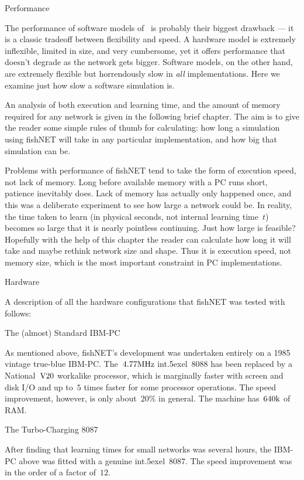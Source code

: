 \chap Performance

The performance of software models of \nns\ is probably their biggest
drawback ---
it is a classic tradeoff between flexibility and speed.
A hardware model is extremely inflexible, limited in size, and very 
cumbersome, yet it
offers performance that doesn't degrade as the network gets bigger.
Software models, on the other hand, are extremely flexible but
horrendously slow in {\sl all} implementations.
Here we examine just how slow a software simulation is.

An analysis of both execution and learning time, and the amount of
memory required for any network is given in the following brief
chapter.
The aim is to give the reader some simple rules of thumb for
calculating: how long a simulation using fishNET will take in any
particular implementation, and how big that simulation can be.

Problems with performance of fishNET tend to take the form of
execution speed, not lack of memory.
Long before available memory with a PC runs short, patience
inevitably does.
Lack of memory has actually only happened once, and this was a
deliberate experiment to see how large a network could be.
In reality, the time taken to learn (in physical seconds, not
internal learning time~$t$) becomes so large that it is nearly
pointless continuing.
Just how large is feasible?
Hopefully with the help of this chapter the reader can calculate how
long it will take and maybe rethink network size and shape.
Thus it is execution speed, not memory size, which is the most
important constraint in PC implementations.

\sec Hardware

A description of all the hardware configurations that fishNET was
tested with follows:

\ssec The (almost) Standard IBM-PC

As mentioned above, fishNET's development was undertaken entirely on
a 1985 vintage true-blue IBM-PC.
The~$4.77 {\rm MHz}$ int\lower.5ex\hbox{e}l~$8088$ has been replaced by a
National~${\rm V}20$ workalike processor, which is marginally faster
with screen and disk I/O and up to~$5$ times faster for some
processor operations.
The speed improvement, however, is only about~$20\%$ in general.
The machine has~$640{\rm k}$ of RAM.

\ssec The Turbo-Charging 8087

After finding that learning times for small networks was several
hours, the IBM-PC above was
fitted with a genuine int\lower.5ex\hbox{e}l~$8087$.
The speed improvement was in the order of a factor of~$12$.

